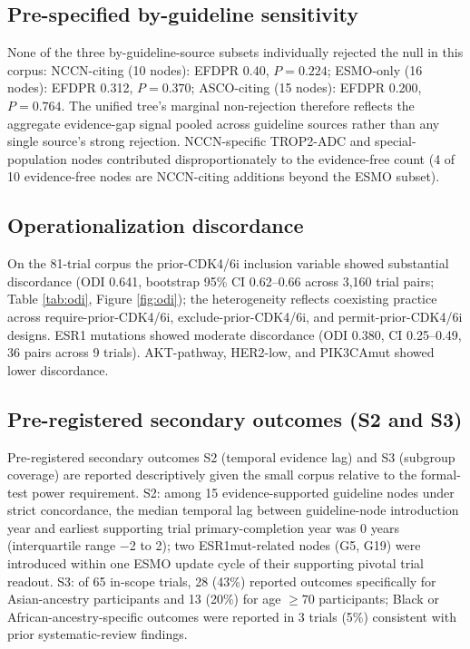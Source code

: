 \documentclass[11pt,a4paper]{article}
\begin{document}
\begin{table}[!t]
\centering\small
\caption{Evidence-free decision-point ratio: primary + by-guideline-source sensitivity.}
\label{tab:efdpr}

\end{table}

\subsection{Pre-specified by-guideline sensitivity}
None of the three by-guideline-source subsets individually rejected the null in this corpus: NCCN-citing (10 nodes): EFDPR 0.40, $P = 0.224$; ESMO-only (16 nodes): EFDPR 0.312, $P = 0.370$; ASCO-citing (15 nodes): EFDPR 0.200, $P = 0.764$. The unified tree's marginal non-rejection therefore reflects the aggregate evidence-gap signal pooled across guideline sources rather than any single source's strong rejection. NCCN-specific TROP2-ADC and special-population nodes contributed disproportionately to the evidence-free count (4 of 10 evidence-free nodes are NCCN-citing additions beyond the ESMO subset).

\subsection{Operationalization discordance}
On the 81-trial corpus the prior-CDK4/6i inclusion variable showed substantial discordance (ODI 0.641, bootstrap 95\% CI 0.62--0.66 across 3,160 trial pairs; Table \ref{tab:odi}, Figure \ref{fig:odi}); the heterogeneity reflects coexisting practice across require-prior-CDK4/6i, exclude-prior-CDK4/6i, and permit-prior-CDK4/6i designs. ESR1 mutations showed moderate discordance (ODI 0.380, CI 0.25--0.49, 36 pairs across 9 trials). AKT-pathway, HER2-low, and PIK3CAmut showed lower discordance.

\subsection{Pre-registered secondary outcomes (S2 and S3)}
Pre-registered secondary outcomes S2 (temporal evidence lag) and S3 (subgroup coverage) are reported descriptively given the small corpus relative to the formal-test power requirement. S2: among 15 evidence-supported guideline nodes under strict concordance, the median temporal lag between guideline-node introduction year and earliest supporting trial primary-completion year was 0 years (interquartile range $-$2 to 2); two ESR1mut-related nodes (G5, G19) were introduced within one ESMO update cycle of their supporting pivotal trial readout. S3: of 65 in-scope trials, 28 (43\%) reported outcomes specifically for Asian-ancestry participants and 13 (20\%) for age $\ge 70$ participants; Black or African-ancestry-specific outcomes were reported in 3 trials (5\%) consistent with prior systematic-review findings.\citep{niranjan2020representation}
\end{document}
